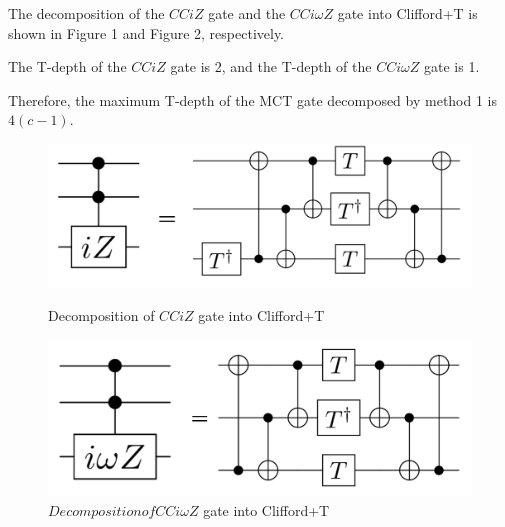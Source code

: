 The decomposition of the $CCiZ$ gate and the $CCi\omega Z$ gate into Clifford+T is shown in Figure 1 and Figure 2, respectively.

The T-depth of the $CCiZ$ gate is 2, and the T-depth of the $CCi\omega Z$ gate is 1.

Therefore, the maximum T-depth of the MCT gate decomposed by method 1 is $4(c-1)$.

\begin{figure}[tbp]

\centering

\begin{minipage}[b]{0.49\columnwidth}

\centering

\includegraphics[width=0.9\columnwidth]{img/cciz.pdf}

\caption{Decomposition of $CCiZ$ gate into Clifford+T}

\label{cciz}

\end{minipage}

\begin{minipage}[b]{0.49\columnwidth}

\centering

\includegraphics[width=0.9\columnwidth]{img/cciomegaz.pdf}

\caption{$Decomposition of CCi\omega Z$ gate into Clifford+T}
\label{cciomegaz}
\end{minipage}
\end{figure}
